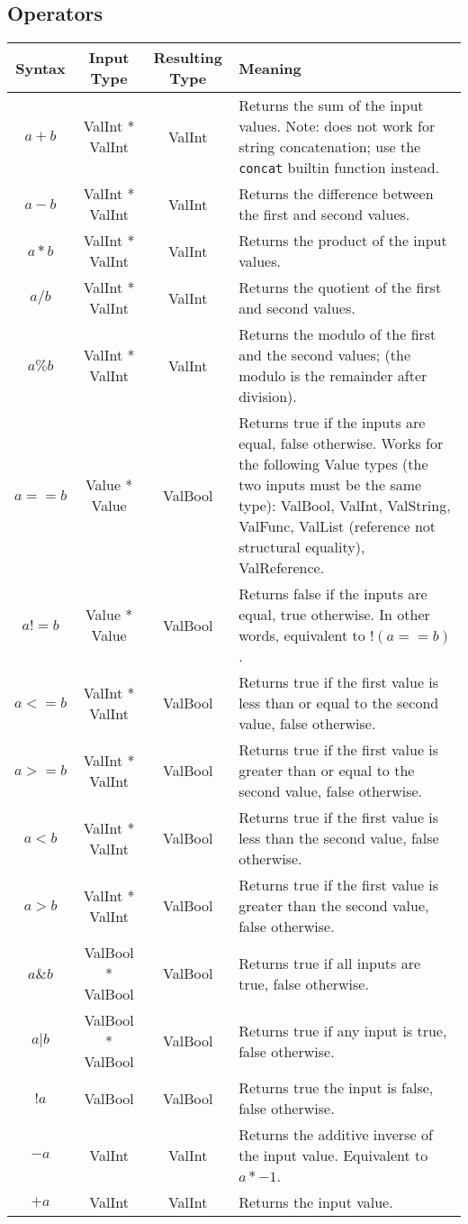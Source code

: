 \documentclass{article}
\begin{document}
\subsection{Operators}
\begin{center}
 \begin{tabularx}{\linewidth}{|c|c|c|X|} 
 \hline
 Syntax & Input Type & Resulting Type & Meaning \\
 \hline
 $a + b$ & ValInt * ValInt & ValInt & Returns the sum of the input values. Note: does not work for string concatenation; use the \texttt{concat} builtin function instead. \\ 
 \hline
 $a - b$ & ValInt * ValInt & ValInt & Returns the difference between the first and second values. \\ 
 \hline
 $a * b$ & ValInt * ValInt & ValInt & Returns the product of the input values. \\ 
 \hline
 $a / b$ & ValInt * ValInt & ValInt & Returns the quotient of the first and second values. \\
 \hline
 $a \% b$ & ValInt * ValInt & ValInt & Returns the modulo of the first and the second values; (the modulo is the remainder after division). \\ 
 \hline
 $a == b$ & Value * Value & ValBool & Returns true if the inputs are equal, false otherwise. Works for the following Value types (the two inputs must be the same type): ValBool, ValInt, ValString, ValFunc, ValList (reference not structural equality), ValReference. \\ 
 \hline
 $a != b$ & Value * Value & ValBool & Returns false if the inputs are equal, true otherwise. In other words, equivalent to $!(a == b)$. \\
 \hline
 $a <= b$ & ValInt * ValInt & ValBool & Returns true if the first value is less than or equal to the second value, false otherwise. \\
 \hline
 $a >= b$ & ValInt * ValInt & ValBool & Returns true if the first value is greater than or equal to the second value, false otherwise. \\
 \hline
 $a < b$ & ValInt * ValInt & ValBool & Returns true if the first value is less than the second value, false otherwise. \\
 \hline
 $a > b$ & ValInt * ValInt & ValBool & Returns true if the first value is greater than the second value, false otherwise. \\
 \hline
 $a \& b$ & ValBool * ValBool & ValBool & Returns true if all inputs are true, false otherwise. \\
 \hline
 $a | b$ & ValBool * ValBool & ValBool & Returns true if any input is true, false otherwise. \\
 \hline
 $!a$ & ValBool & ValBool & Returns true the input is false, false otherwise. \\
 \hline
 $-a$ & ValInt & ValInt & Returns the additive inverse of the input value. Equivalent to $a * -1$. \\
 \hline
 $+a$ & ValInt & ValInt & Returns the input value. \\
 \hline
\end{tabularx}
\end{center}
\end{document}
